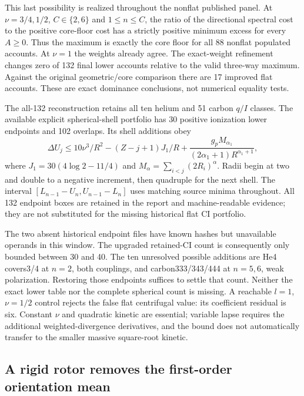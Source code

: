 This last possibility is realized throughout the nonflat published panel.
At $\nu=3/4,1/2$, $C\in\{2,6\}$ and $1\le n\le C$, the ratio of the
directional spectral cost to the positive core-floor cost has a strictly
positive minimum excess for every $A\ge0$. Thus the maximum is exactly
the core floor for all 88 nonflat populated accounts. At $\nu=1$ the
weights already agree. The exact-weight refinement changes zero of 132
final lower accounts relative to the valid three-way maximum. Against
the original geometric/core comparison there are 17 improved flat accounts.
These are exact dominance conclusions, not numerical equality tests.

The all-132 reconstruction retains all ten helium and 51 carbon $q/I$
classes. The available explicit spherical-shell portfolio has 30 positive
ionization lower endpoints and 102 overlaps. Its shell additions obey
\begin{equation}
 \Delta U_j\le10\nu^3/R^2-(Z-j+1)J_1/R
              +\frac{g_pM_{\alpha_1}}{(2\alpha_1+1)R^{\alpha_1+1}},
\end{equation}
where $J_1=30(4\log2-11/4)$ and
$M_\alpha=\sum_{i<j}(2R_i)^\alpha$. Radii begin at two and double to a
negative increment, then quadruple for the next shell. The interval
$[L_{n-1}-U_n,U_{n-1}-L_n]$ uses matching source minima throughout.
All 132 endpoint boxes are retained in the report and machine-readable
evidence; they are not substituted for the missing historical flat CI
portfolio.

The two absent historical endpoint files have known hashes but unavailable
operands in this window. The upgraded retained-CI count is consequently
only bounded between 30 and 40. The ten unresolved possible additions are
He4 covers3/4 at $n=2$, both couplings, and carbon333/343/444 at $n=5,6$,
weak polarization. Restoring those endpoints suffices to settle that count.
Neither the exact lower table nor the complete spherical count is missing.
A reachable $l=1$, $\nu=1/2$ control rejects the false flat centrifugal value: its coefficient residual is six. Constant $\nu$ and quadratic kinetic are essential; variable lapse requires
the additional weighted-divergence derivatives, and the bound does not
automatically transfer to the smaller massive square-root kinetic.

\subsection{A rigid rotor removes the first-order orientation mean}
\label{sec:rotor-12}


